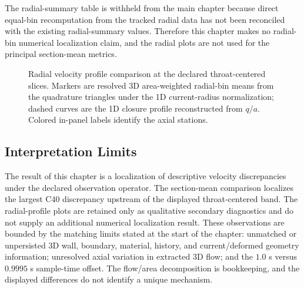 The radial-summary table is withheld from the main chapter because direct
equal-bin recomputation from the tracked radial data has not been reconciled
with the existing radial-summary values. Therefore this chapter makes no
radial-bin numerical localization claim, and the radial plots are not used for
the principal section-mean metrics.

\begin{figure}[H]
    \centering
    \captionsetup{aboveskip=2pt,belowskip=2pt}
    \caption{Radial velocity profile comparison at the declared throat-centered
    slices. Markers are resolved 3D area-weighted radial-bin means from the
    quadrature triangles under the 1D current-radius normalization; dashed
    curves are the 1D closure profile reconstructed from $q/a$. Colored in-panel
    labels identify the axial stations.}
    \label{fig:t1-radial-profile-comparison}
\end{figure}

\subsection{Interpretation Limits}
\label{subsec:spatial-localization-discrepancies}

The result of this chapter is a localization of descriptive velocity
discrepancies under the declared observation operator. The section-mean
comparison localizes the largest C40 discrepancy upstream of the displayed
throat-centered band. The radial-profile plots are retained only as qualitative
secondary diagnostics and do not supply an additional numerical localization
result. These observations are bounded by the matching limits stated at the
start of the chapter: unmatched or unpersisted 3D wall, boundary, material,
history, and current/deformed geometry information; unresolved axial variation
in extracted 3D flow; and the $1.0$ s versus $0.9995$ s sample-time offset. The
flow/area decomposition is bookkeeping, and the displayed differences do not
identify a unique mechanism.
